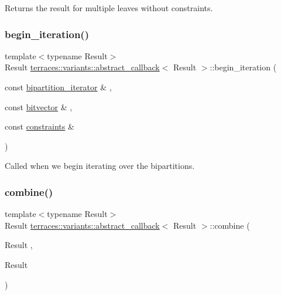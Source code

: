 Returns the result for multiple leaves without constraints. \mbox{\label{classterraces_1_1variants_1_1abstract__callback_a1a774cf9c621fa1559d0a29980ca27df}} 
\subsubsection{\texorpdfstring{begin\+\_\+iteration()}{begin\_iteration()}}
{\footnotesize\ttfamily template$<$typename Result$>$ \\
Result \hyperlink{classterraces_1_1variants_1_1abstract__callback}{terraces\+::variants\+::abstract\+\_\+callback}$<$ Result $>$\+::begin\+\_\+iteration (\begin{DoxyParamCaption}\item[{const \hyperlink{classterraces_1_1bipartition__iterator}{bipartition\+\_\+iterator} \&}]{,  }\item[{const \hyperlink{namespaceterraces_a1b526fb554dff829f7ad51eb21d5ed06}{bitvector} \&}]{,  }\item[{const \hyperlink{namespaceterraces_a6f603ffd30ed4d902fce6424492e0581}{constraints} \&}]{ }\end{DoxyParamCaption})\hspace{0.3cm}{\ttfamily [inline]}}

Called when we begin iterating over the bipartitions. \mbox{\label{classterraces_1_1variants_1_1abstract__callback_a5978e41947d47b33f643d356750d07d8}} 
\subsubsection{\texorpdfstring{combine()}{combine()}}
{\footnotesize\ttfamily template$<$typename Result$>$ \\
Result \hyperlink{classterraces_1_1variants_1_1abstract__callback}{terraces\+::variants\+::abstract\+\_\+callback}$<$ Result $>$\+::combine (\begin{DoxyParamCaption}\item[{Result}]{,  }\item[{Result}]{ }\end{DoxyParamCaption})}

